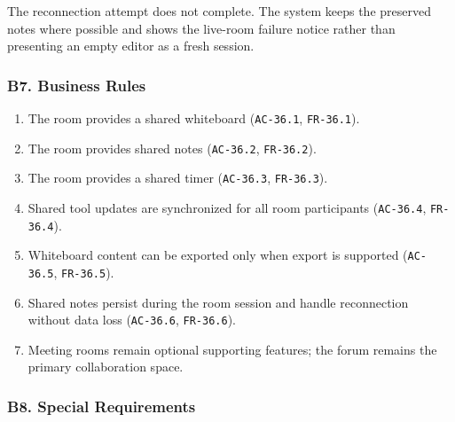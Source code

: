 \documentclass[12pt]{article}
\begin{document}
The reconnection attempt does not complete. The system keeps the preserved notes where possible and shows the live-room failure notice rather than presenting an empty editor as a fresh session.
\par\medskip

\hypertarget{sec:b7-business-rules}{}
\subsubsection*{B7. Business Rules}
\par\medskip

\begin{enumerate}
\item The room provides a shared whiteboard (\texttt{AC-36.1}, \texttt{FR-36.1}).
\item The room provides shared notes (\texttt{AC-36.2}, \texttt{FR-36.2}).
\item The room provides a shared timer (\texttt{AC-36.3}, \texttt{FR-36.3}).
\item Shared tool updates are synchronized for all room participants (\texttt{AC-36.4}, \texttt{FR-36.4}).
\item Whiteboard content can be exported only when export is supported (\texttt{AC-36.5}, \texttt{FR-36.5}).
\item Shared notes persist during the room session and handle reconnection without data loss (\texttt{AC-36.6}, \texttt{FR-36.6}).
\item Meeting rooms remain optional supporting features; the forum remains the primary collaboration space.
\end{enumerate}
\par\medskip

\hypertarget{sec:b8-special-requirements}{}
\subsubsection*{B8. Special Requirements}
\par\medskip
\end{document}
